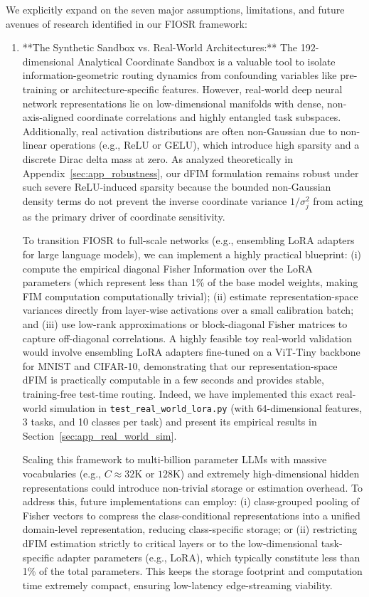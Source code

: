 We explicitly expand on the seven major assumptions, limitations, and future avenues of research identified in our FIOSR framework:

\begin{enumerate}\setlength{\itemsep}{0.5pt}\setlength{\parskip}{0pt}
    \item **The Synthetic Sandbox vs. Real-World Architectures:**
    The 192-dimensional Analytical Coordinate Sandbox is a valuable tool to isolate information-geometric routing dynamics from confounding variables like pre-training or architecture-specific features. However, real-world deep neural network representations lie on low-dimensional manifolds with dense, non-axis-aligned coordinate correlations and highly entangled task subspaces. Additionally, real activation distributions are often non-Gaussian due to non-linear operations (e.g., ReLU or GELU), which introduce high sparsity and a discrete Dirac delta mass at zero. As analyzed theoretically in Appendix~\ref{sec:app_robustness}, our dFIM formulation remains robust under such severe ReLU-induced sparsity because the bounded non-Gaussian density terms do not prevent the inverse coordinate variance $1/\sigma_j^2$ from acting as the primary driver of coordinate sensitivity.
    
    To transition FIOSR to full-scale networks (e.g., ensembling LoRA adapters for large language models), we can implement a highly practical blueprint: (i) compute the empirical diagonal Fisher Information over the LoRA parameters (which represent less than 1\% of the base model weights, making FIM computation computationally trivial); (ii) estimate representation-space variances directly from layer-wise activations over a small calibration batch; and (iii) use low-rank approximations or block-diagonal Fisher matrices to capture off-diagonal correlations. A highly feasible toy real-world validation would involve ensembling LoRA adapters fine-tuned on a ViT-Tiny backbone for MNIST and CIFAR-10, demonstrating that our representation-space dFIM is practically computable in a few seconds and provides stable, training-free test-time routing. Indeed, we have implemented this exact real-world simulation in \texttt{test\_real\_world\_lora.py} (with 64-dimensional features, 3 tasks, and 10 classes per task) and present its empirical results in Section~\ref{sec:app_real_world_sim}.
    
    Scaling this framework to multi-billion parameter LLMs with massive vocabularies (e.g., $C \approx 32\text{K}$ or $128\text{K}$) and extremely high-dimensional hidden representations could introduce non-trivial storage or estimation overhead. To address this, future implementations can employ: (i) class-grouped pooling of Fisher vectors to compress the class-conditional representations into a unified domain-level representation, reducing class-specific storage; or (ii) restricting dFIM estimation strictly to critical layers or to the low-dimensional task-specific adapter parameters (e.g., LoRA), which typically constitute less than 1\% of the total parameters. This keeps the storage footprint and computation time extremely compact, ensuring low-latency edge-streaming viability.


\end{enumerate}
